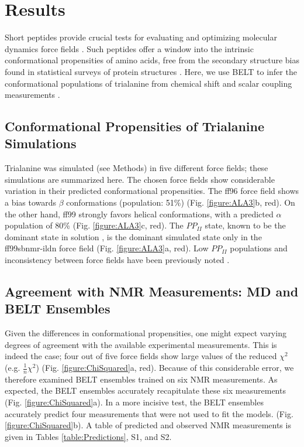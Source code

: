 \documentclass[11pt,titlepage]{article}
\begin{document}
\section*{Results}

Short peptides provide crucial tests for evaluating and optimizing molecular dynamics force fields  \citep{Graf2007,beauchamp2012protein, nerenberg2011, best2008, Grdadolnik2011}.  Such peptides offer a window into the intrinsic conformational propensities of amino acids, free from the secondary structure bias found in statistical surveys of protein structures  \citep{Jha2005}.  Here, we use BELT to infer the conformational populations of trialanine from chemical shift and scalar coupling measurements  \citep{Graf2007}.  


\subsection*{Conformational Propensities of Trialanine Simulations}

Trialanine was simulated (see Methods) in five different force fields; these simulations are summarized here.  The chosen force fields show considerable variation in their predicted conformational propensities.  The ff96 force field shows a bias towards $\beta$ conformations (population: 51\%) (Fig. \ref{figure:ALA3}b, red).  On the other hand, ff99 strongly favors helical conformations, with a predicted $\alpha$ population of 80\% (Fig. \ref{figure:ALA3}c, red).  The $PP_{II}$ state, known to be the dominant state in solution \citep{Grdadolnik2011, Graf2007, Avbelj2006}, is the dominant simulated state only in the ff99sbnmr-ildn force field (Fig. \ref{figure:ALA3}a, red).  Low $PP_{II}$ populations and inconsistency between force fields have been previously noted \citep{Graf2007, beauchamp2012protein, nerenberg2011, best2008}.  

\subsection*{Agreement with NMR Measurements: MD and BELT Ensembles}

Given the differences in conformational propensities, one might expect varying degrees of agreement with the available experimental measurements.  This is indeed the case; four out of five force fields show large values of the reduced $\chi^2$ (e.g. $\frac{1}{n} \chi^2$) (Fig. \ref{figure:ChiSquared}a, red).  Because of this considerable error, we therefore examined BELT ensembles trained on six NMR measurements.  As expected, the BELT ensembles accurately recapitulate these six measurements (Fig. \ref{figure:ChiSquared}a).  In a more incisive test, the BELT ensembles accurately predict four measurements that were not used to fit the models.   (Fig. \ref{figure:ChiSquared}b).  A table of predicted and observed NMR measurements is given in Tables \ref{table:Predictions}, S1, and S2.  
\end{document}
